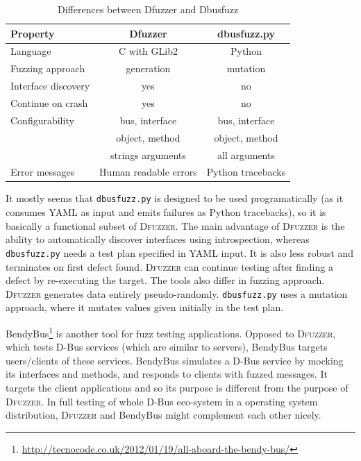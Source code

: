 \documentclass[conference]{IEEEtran}
\begin{document}
\FloatBarrier
\begin{table}[!h]
\caption{Differences between Dfuzzer and Dbusfuzz}
\label{tab:differences}
\begin{center}
	\begin{tabular}{|l|c|c|}
	\hline
	\textbf{Property} & \textbf{Dfuzzer} & \textbf{dbusfuzz.py} \\ \hline \hline
	Language & C with GLib2 & Python \\ \hline
	Fuzzing approach & generation & mutation \\ \hline
	Interface discovery & yes & no \\ \hline
	Continue on crash & yes & no \\ \hline
	Configurability & bus, interface & bus, interface  \\
	 & object, method & object, method \\
	 & strings arguments & all arguments \\ \hline
	Error messages & Human readable errors & Python tracebacks \\ \hline
 
	\end{tabular}
\end{center}
\end{table}
\FloatBarrier

It mostly seems that \texttt{dbusfuzz.py} is designed to be used programatically
(as it consumes YAML as input and emits failures as Python tracebacks), so it is basically a functional subset of \textsc{Dfuzzer}. The main advantage
of \textsc{Dfuzzer} is the ability to automatically discover interfaces using
introspection, whereas \texttt{dbusfuzz.py} needs a test plan specified in YAML
input.
It is also less robust and terminates on first defect found. \textsc{Dfuzzer} can
continue testing after finding a defect by re-executing the target. The tools
also differ in fuzzing approach. \textsc{Dfuzzer} generates data entirely
pseudo-randomly. \texttt{dbusfuzz.py} uses a mutation approach, where it mutates
values given initially in the test plan.


BendyBus\footnote{\url{http://tecnocode.co.uk/2012/01/19/all-aboard-the-bendy-bus/}}
is another tool for fuzz testing applications. Opposed to \textsc{Dfuzzer},
which tests D-Bus services (which are similar to servers), BendyBus targets
users/clients of these services. BendyBus simulates a D-Bus service by mocking
its interfaces and methods, and responds to clients with fuzzed messages. It
targets the client applications and so its purpose is different from the
purpose of \textsc{Dfuzzer}. In full testing of whole D-Bus eco-system in a
operating system distribution, \textsc{Dfuzzer} and BendyBus might complement each other nicely.
\end{document}
